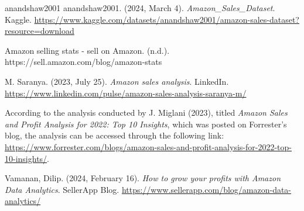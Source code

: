 \documentclass[11pt]{article} %
\begin{document}
\begin{thebibliography}{5}

    {anandshaw2001}
    anandshaw2001. (2024, March 4). \textit{Amazon\_Sales\_Dataset}. Kaggle. \url{https://www.kaggle.com/datasets/anandshaw2001/amazon-sales-dataset?resource=download}
    
    Amazon selling stats - sell on Amazon. (n.d.). https://sell.amazon.com/blog/amazon-stats 
    
    M. Saranya. (2023, July 25). \textit{Amazon sales analysis}. LinkedIn. \url{https://www.linkedin.com/pulse/amazon-sales-analysis-saranya-m/}
    
    
    According to the analysis conducted by J. Miglani (2023), titled \textit{Amazon Sales and Profit Analysis for 2022: Top 10 Insights}, which was posted on Forrester's blog, the analysis can be accessed through the following link: \url{https://www.forrester.com/blogs/amazon-sales-and-profit-analysis-for-2022-top-10-insights/}.
    
    
    Vamanan, Dilip. (2024, February 16). \textit{How to grow your profits with Amazon Data Analytics}. SellerApp Blog. \url{https://www.sellerapp.com/blog/amazon-data-analytics/}

\end{thebibliography}
\end{document}
